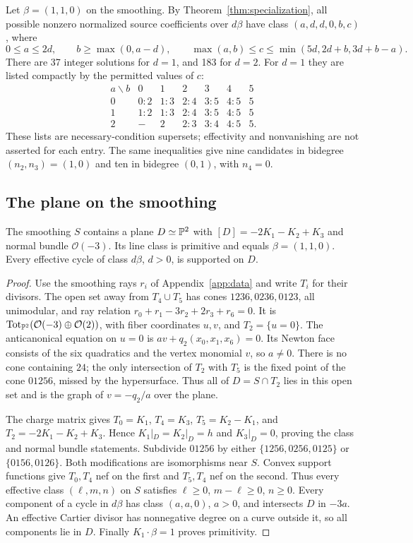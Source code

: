 Let $\beta=(1,1,0)$ on the smoothing. By
Theorem~\ref{thm:specialization}, all possible nonzero normalized
source coefficients over $d\beta$ have class $(a,d,d,0,b,c)$, where
\begin{equation}\label{eq:candidates}
 0\le a\le2d,\qquad b\ge\max(0,a-d),\qquad
 \max(a,b)\le c\le\min(5d,2d+b,3d+b-a).
\end{equation}
There are 37 integer solutions for $d=1$, and 183 for $d=2$.
For $d=1$ they are listed compactly by the permitted values of $c$:
\[
\begin{array}{c|rrrrrr}
a\backslash b&0&1&2&3&4&5\\ \hline
0&0\!:\!2&1\!:\!3&2\!:\!4&3\!:\!5&4\!:\!5&5\\
1&1\!:\!2&1\!:\!3&2\!:\!4&3\!:\!5&4\!:\!5&5\\
2&-&2&2\!:\!3&3\!:\!4&4\!:\!5&5.
\end{array}
\]
These lists are necessary-condition supersets; effectivity and
nonvanishing are not asserted for each entry. The same inequalities
give nine candidates in bidegree $(n_2,n_3)=(1,0)$ and ten in
bidegree $(0,1)$, with $n_4=0$.

\subsection{The plane on the smoothing}
\begin{proposition}\label{prop:plane}
The smoothing $S$ contains a plane $D\simeq\mathbb P^2$ with
$[D]=-2K_1-K_2+K_3$ and normal bundle $\mathcal O(-3)$.
Its line class is primitive and equals $\beta=(1,1,0)$.
Every effective cycle of class $d\beta$, $d>0$, is supported on $D$.
\end{proposition}
\begin{proof}
Use the smoothing rays $r_i$ of Appendix~\ref{app:data} and write
$T_i$ for their divisors. The open set away from $T_4\cup T_5$ has
cones $1236,0236,0123$, all unimodular, and ray relation
$r_0+r_1-3r_2+2r_3+r_6=0$. It is
$\operatorname{Tot}_{\mathbb P^2}(\mathcal O(-3)\oplus\mathcal O(2))$, with fiber
coordinates $u,v$, and $T_2=\{u=0\}$. The anticanonical equation
on $u=0$ is $av+q_2(x_0,x_1,x_6)=0$. Its Newton face consists of
the six quadratics and the vertex monomial $v$, so $a\ne0$.
There is no cone containing $24$; the only intersection of $T_2$
with $T_5$ is the fixed point of the cone $01256$, missed by the
hypersurface. Thus all of $D=S\cap T_2$ lies in this open set and
is the graph of $v=-q_2/a$ over the plane.

The charge matrix gives $T_0=K_1$, $T_4=K_3$, $T_5=K_2-K_1$,
and $T_2=-2K_1-K_2+K_3$. Hence $K_1|_D=K_2|_D=h$ and
$K_3|_D=0$, proving the class and normal bundle statements.
Subdivide $01256$ by either $\{1256,0256,0125\}$ or
$\{0156,0126\}$. Both modifications are isomorphisms near $S$.
Convex support functions give $T_0,T_4$ nef on the first and
$T_5,T_4$ nef on the second. Thus every effective class
$(\ell,m,n)$ on $S$ satisfies $\ell\ge0$, $m-\ell\ge0$, $n\ge0$.
Every component of a cycle in $d\beta$ has class $(a,a,0)$,
$a>0$, and intersects $D$ in $-3a$. An effective Cartier divisor
has nonnegative degree on a curve outside it, so all components
lie in $D$. Finally $K_1\cdot\beta=1$ proves primitivity.
\end{proof}
